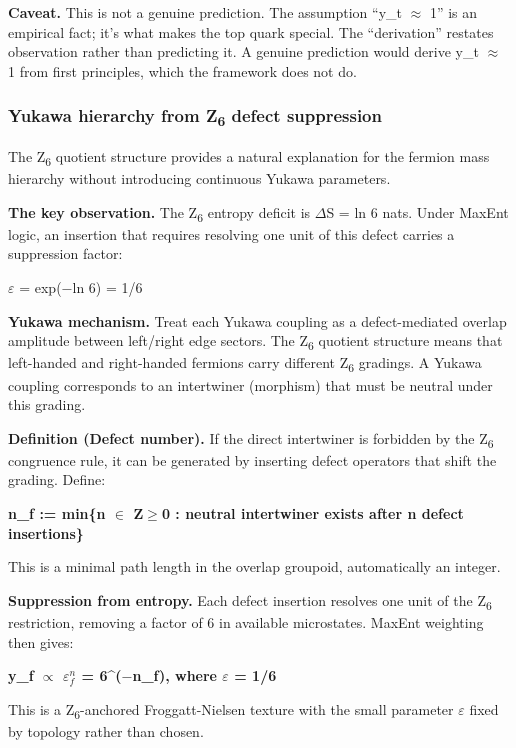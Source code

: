 \documentclass[11pt,a4paper]{article}
\theoremstyle{remark}
\begin{document}
\textbf{Caveat.} This is not a genuine prediction. The assumption ``y\_t \ensuremath{\approx} 1'' is an empirical fact; it's what makes the top quark special. The ``derivation'' restates observation rather than predicting it. A genuine prediction would derive y\_t \ensuremath{\approx} 1 from first principles, which the framework does not do.

\subsubsection{Yukawa hierarchy from Z\textsubscript{6} defect suppression}\label{yukawa-hierarchy-from-zux2086-defect-suppression}

The Z\textsubscript{6} quotient structure provides a natural explanation for the fermion
mass hierarchy without introducing continuous Yukawa parameters.

\textbf{The key observation.} The Z\textsubscript{6} entropy deficit is \ensuremath{\Delta}S = ln 6 nats. Under MaxEnt logic, an insertion that requires resolving one unit of this defect carries a suppression factor:

\ensuremath{\varepsilon} = exp(\ensuremath{-}ln 6) = 1/6

\textbf{Yukawa mechanism.} Treat each Yukawa coupling as a defect-mediated overlap amplitude between left/right edge sectors. The Z\textsubscript{6} quotient structure means that left-handed and right-handed fermions carry different Z\textsubscript{6} gradings. A Yukawa coupling corresponds to an intertwiner (morphism) that must be neutral under this grading.

\textbf{Definition (Defect number).} If the direct intertwiner is forbidden by the Z\textsubscript{6} congruence rule, it can be generated by inserting defect operators that shift the grading. Define:

\textbf{n\_f := min\{n \ensuremath{\in} Z\ensuremath{\geq}0 : neutral intertwiner exists after n defect insertions\}}

This is a minimal path length in the overlap groupoid, automatically an integer.

\textbf{Suppression from entropy.} Each defect insertion resolves one unit of the Z\textsubscript{6} restriction, removing a factor of 6 in available microstates. MaxEnt weighting then gives:

\textbf{y\_f \ensuremath{\propto} $\varepsilon^n_f$ = 6\^{}(\ensuremath{-}n\_f), where \ensuremath{\varepsilon} = 1/6}

This is a Z\textsubscript{6}-anchored Froggatt-Nielsen texture with the small parameter \ensuremath{\varepsilon} fixed by topology rather than chosen.
\end{document}
